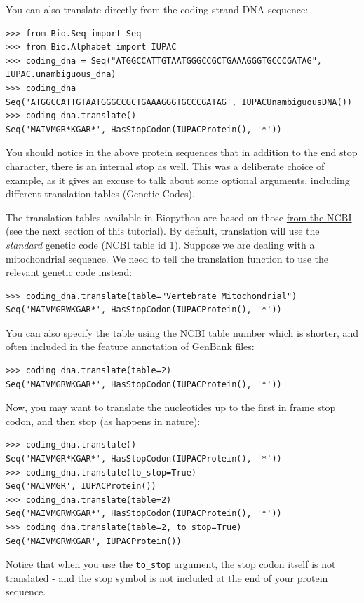 \documentclass{report}
\begin{document}
You can also translate directly from the coding strand DNA sequence:
\begin{verbatim}
>>> from Bio.Seq import Seq
>>> from Bio.Alphabet import IUPAC
>>> coding_dna = Seq("ATGGCCATTGTAATGGGCCGCTGAAAGGGTGCCCGATAG", IUPAC.unambiguous_dna)
>>> coding_dna
Seq('ATGGCCATTGTAATGGGCCGCTGAAAGGGTGCCCGATAG', IUPACUnambiguousDNA())
>>> coding_dna.translate()
Seq('MAIVMGR*KGAR*', HasStopCodon(IUPACProtein(), '*'))
\end{verbatim}

You should notice in the above protein sequences that in addition to the end stop character, there is an internal stop as well.  This was a deliberate choice of example, as it gives an excuse to talk about some optional arguments, including different translation tables (Genetic Codes).

The translation tables available in Biopython are based on those \href{http://www.ncbi.nlm.nih.gov/Taxonomy/Utils/wprintgc.cgi}{from the NCBI} (see the next section of this tutorial).  By default, translation will use the \emph{standard} genetic code (NCBI table id 1).
Suppose we are dealing with a mitochondrial sequence.  We need to tell the translation function to use the relevant genetic code instead:
\begin{verbatim}
>>> coding_dna.translate(table="Vertebrate Mitochondrial")
Seq('MAIVMGRWKGAR*', HasStopCodon(IUPACProtein(), '*'))
\end{verbatim}

You can also specify the table using the NCBI table number which is shorter, and often included in the feature annotation of GenBank files:
\begin{verbatim}
>>> coding_dna.translate(table=2)
Seq('MAIVMGRWKGAR*', HasStopCodon(IUPACProtein(), '*'))
\end{verbatim}

Now, you may want to translate the nucleotides up to the first in frame stop codon,
and then stop (as happens in nature):
\begin{verbatim}
>>> coding_dna.translate()
Seq('MAIVMGR*KGAR*', HasStopCodon(IUPACProtein(), '*'))
>>> coding_dna.translate(to_stop=True)
Seq('MAIVMGR', IUPACProtein())
>>> coding_dna.translate(table=2)
Seq('MAIVMGRWKGAR*', HasStopCodon(IUPACProtein(), '*'))
>>> coding_dna.translate(table=2, to_stop=True)
Seq('MAIVMGRWKGAR', IUPACProtein())
\end{verbatim}
\noindent Notice that when you use the \verb|to_stop| argument, the stop codon itself
is not translated - and the stop symbol is not included at the end of your protein
sequence.
\end{document}
